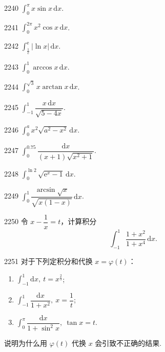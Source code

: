 \begin{prob}[S]{2240}
$\int_0^\pi x\sin x\,\mathrm{d}x$.
\end{prob}

\begin{prob}[S]{2241}
$\int_0^{2\pi} x^2 \cos x\,\mathrm{d}x$.
\end{prob}

\begin{prob}[S]{2242}
$\int_{\frac{1}{\mathrm{e}}}^{\mathrm{e}} |\ln x|\,\mathrm{d}x$.
\end{prob}

\begin{prob}[S]{2243}
$\int_0^1 \arccos x\,\mathrm{d}x$.
\end{prob}

\begin{prob}[S]{2244}
$\int_0^{\sqrt{3}} x\arctan x\,\mathrm{d}x$.
\end{prob}


\begin{prob}[S]{2245}
$\int_{-1}^1 \dfrac{x\,\mathrm{d}x}{\sqrt{5-4x}}$.
\end{prob}

\begin{prob}[S]{2246}
$\int_0^a x^2\sqrt{a^2-x^2}\,\mathrm{d}x$.
\end{prob}

\begin{prob}[S]{2247}
$\int_0^{0.75} \dfrac{\mathrm{d}x}{(x+1)\sqrt{x^2+1}}$.
\end{prob}

\begin{prob}[S]{2248}
$\int_0^{\ln 2} \sqrt{\mathrm{e}^x - 1}\,\mathrm{d}x$.
\end{prob}

\begin{prob}[S]{2249}
$\int_0^1 \dfrac{\arcsin \sqrt{x}}{\sqrt{x(1-x)}}\,\mathrm{d}x$.
\end{prob}

\begin{prob}[M]{2250}
令 $x - \dfrac{1}{x} = t$，计算积分
\[ \int_{-1}^1 \frac{1+x^2}{1+x^4}\,\mathrm{d}x. \]
\end{prob}

\begin{prob}[L]{2251}
对于下列定积分和代换 $x = \varphi(t)$：
\begin{enumerate}[label=(\alph*), itemsep=2pt, topsep=3pt]
  \item $\int_{-1}^1 \mathrm{d}x,\ t = x^{\frac{2}{3}}$;
  \item $\int_{-1}^1 \dfrac{\mathrm{d}x}{1+x^2},\ x = \dfrac{1}{t}$;
  \item $\int_0^\pi \dfrac{\mathrm{d}x}{1+\sin^2 x},\ \tan x = t$.
\end{enumerate}
说明为什么用 $\varphi(t)$ 代换 $x$ 会引致不正确的结果.
\end{prob}

